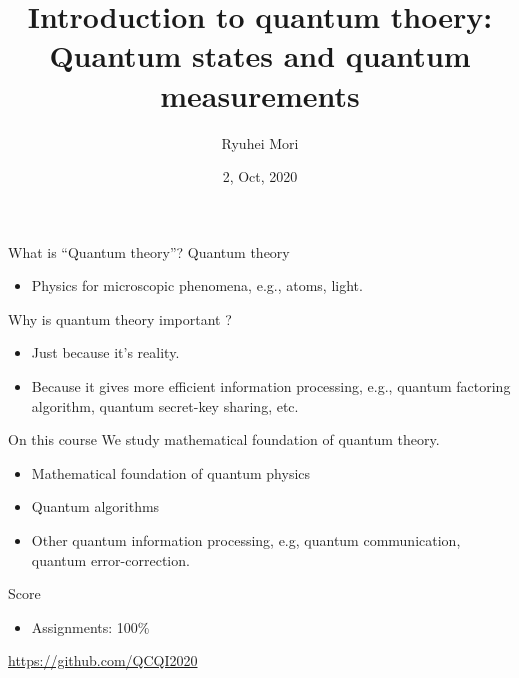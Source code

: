 \documentclass{beamer}
\title{Introduction to quantum thoery: Quantum states and quantum measurements}
\author{Ryuhei Mori}
\institute{Tokyo Institute of Technology}
\date{2, Oct, 2020}
\newcommand\emm[1]{\textcolor{redorange}{{#1}}}
\theoremstyle{definition}
\begin{document}
\begin{frame}[plain]
\maketitle
\end{frame}


\begin{frame}{What is ``Quantum theory''?}
Quantum theory

\vspace{1em}
\begin{itemize}
\item Physics for microscopic phenomena, e.g., atoms, light.
\end{itemize}

\vspace{2em}
Why is quantum theory important ?

\vspace{1em}
\begin{itemize}
\setlength{\itemsep}{2em}
\item Just because it's \emm{reality}.
\item Because it gives more \emm{efficient} information processing, e.g., quantum factoring algorithm, quantum secret-key sharing, etc.
\end{itemize}
\end{frame}

\begin{frame}{On this course}
We study \emm{mathematical foundation} of quantum theory.
\begin{itemize}
\setlength{\itemsep}{1em}
\item Mathematical foundation of quantum physics
\item Quantum algorithms
\item Other quantum information processing, e.g, quantum communication, quantum error-correction.
\end{itemize}

\vspace{2em}
Score
\begin{itemize}
\item Assignments: 100\%
\end{itemize}

\vfill
\small
\url{https://github.com/QCQI2020}
\end{frame}
\end{document}
